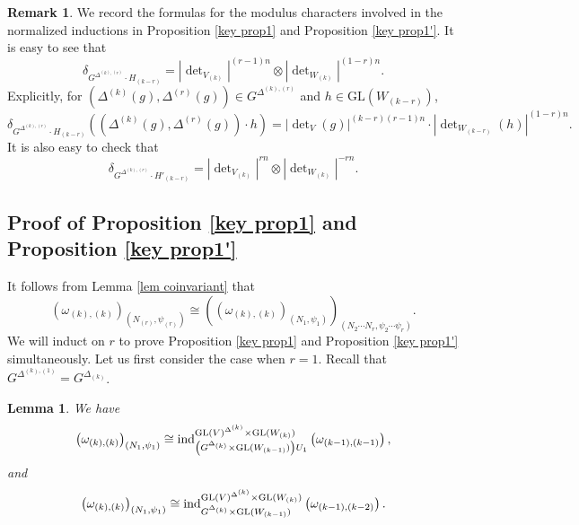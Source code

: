 \documentclass[11pt,reqno]{amsart}
\renewcommand{\1}{{\mathbf{1}}} \newcommand{\sB}{{\mathscr{B}}}
\newcommand{\GL}{{\mathrm{GL}}}\newcommand{\G}{{\mathrm{G}}}
\theoremstyle{plain}
\newtheorem{lem}[thm]{Lemma}  \newtheorem{prop}[thm]{Proposition}
\theoremstyle{definition}
\newtheorem{rem}[thm]{Remark} \newtheorem{fact}[thm]{Fact}
\numberwithin{equation}{section}
\begin{document}
\begin{rem} We record the formulas for the modulus characters  involved in the normalized inductions in Proposition \ref{key prop1} and Proposition \ref{key prop1'}.
It is easy to see that
\begin{equation}\label{equ modulus H}
\delta_{G^{\Delta^{(k),(r)}}\cdot H_{(k-r)}}=|\det\nolimits_{V_{(k)}}|^{(r-1)n}\otimes|\det\nolimits_{W_{(k)}}|^{(1-r)n}.
\end{equation}
Explicitly, for $\left(\Delta^{(k)}(g),\Delta^{(r)}(g)\right)\in G^{\Delta^{(k),(r)}}$ and $h\in\GL(W_{(k-r)})$,
$$\delta_{G^{\Delta^{(k),(r)}}\cdot H_{(k-r)}}\left(\left(\Delta^{(k)}(g),\Delta^{(r)}(g)\right)\cdot h \right)=|\det\nolimits_V(g)|^{(k-r)(r-1)n}\cdot |\det\nolimits_{W_{(k-r)}}(h)|^{(1-r)n}.$$
It is also easy to check that
\begin{equation}\label{equ modulus H'}
\delta_{G^{\Delta^{(k),(r)}}\cdot H'_{(k-r)}}=|\det\nolimits_{V_{(k)}}|^{rn}\otimes |\det\nolimits_{W_{(k)}}|^{-rn}.
\end{equation}
\end{rem}

\subsection{Proof of Proposition \ref{key prop1} and Proposition \ref{key prop1'} } 
It follows from Lemma \ref{lem coinvariant} that
$$\left(\omega_{(k),(k)}\right)_{\left(N_{(r)},\psi_{(r)}\right)}\cong\left(\left(\omega_{(k),(k)}\right)_{\left(N_1,\psi_1\right)}\right)_{\left(N_2\cdots N_r,\psi_2\cdots\psi_r\right)}.$$ We will induct on $r$ to prove Proposition \ref{key prop1} and Proposition \ref{key prop1'} simultaneously.  Let us first consider the case when $r=1$. Recall that $G^{\Delta^{(k),(1)}}=G^{\Delta_{(k)}}$.

\begin{lem}\label{lem 1st isom} We have
$$\left(\omega_{(k),(k)}\right)_{\left(N_{1},\psi_1\right)}\cong \ind_{\left(G^{\Delta_{(k)}}\times\GL(W_{(k-1)})\right)U_1}^{\GL(V)^{\Delta^{(k)}}\times\GL(W_{(k)})}\left(\omega_{(k-1),(k-1)}\right),$$ 
and $$\left(\omega_{(k),(k)}\right)_{\left(N_{1},\psi_1\right)}\cong \ind_{G^{\Delta_{(k)}}\times\GL(W_{(k-1)})}^{\GL(V)^{\Delta^{(k)}}\times\GL(W_{(k)})}\left(\omega_{(k-1),(k-2)}\right).$$
\end{lem}
\end{document}
